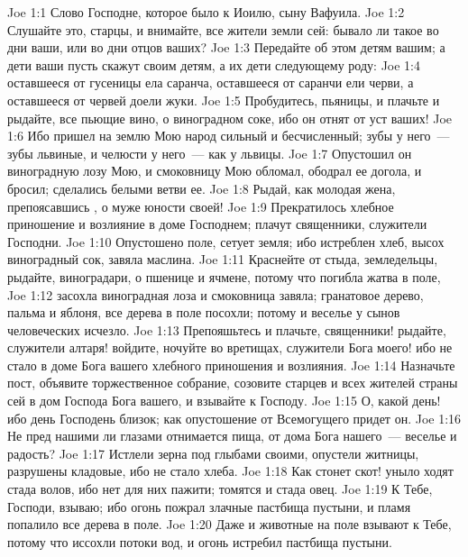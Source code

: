 \vs Joe 1:1 Слово Господне, которое было к Иоилю, сыну Вафуила.
\vs Joe 1:2 Слушайте это, старцы, и внимайте, все жители земли сей: бывало ли такое во дни ваши, или во дни отцов ваших?
\vs Joe 1:3 Передайте об этом детям вашим; а дети ваши пусть скажут своим детям, а их дети следующему роду:
\vs Joe 1:4 оставшееся от гусеницы ела саранча, оставшееся от саранчи ели черви, а оставшееся от червей доели жуки.
\vs Joe 1:5 Пробудитесь, пьяницы, и плачьте и рыдайте, все пьющие вино, о виноградном соке, ибо он отнят от уст ваших!
\vs Joe 1:6 Ибо пришел на землю Мою народ сильный и бесчисленный; зубы у него~--- зубы львиные, и челюсти у него~--- как у львицы.
\vs Joe 1:7 Опустошил он виноградную лозу Мою, и смоковницу Мою обломал, ободрал ее догола, и бросил; сделались белыми ветви ее.
\vs Joe 1:8 Рыдай, как молодая жена, препоясавшись , о муже юности своей!
\vs Joe 1:9 Прекратилось хлебное приношение и возлияние в доме Господнем; плачут священники, служители Господни.
\vs Joe 1:10 Опустошено поле, сетует земля; ибо истреблен хлеб, высох виноградный сок, завяла маслина.
\vs Joe 1:11 Краснейте от стыда, земледельцы, рыдайте, виноградари, о пшенице и ячмене, потому что погибла жатва в поле,
\vs Joe 1:12 засохла виноградная лоза и смоковница завяла; гранатовое дерево, пальма и яблоня, все дерева в поле посохли; потому и веселье у сынов человеческих исчезло.
\vs Joe 1:13 Препояшьтесь  и плачьте, священники! рыдайте, служители алтаря! войдите, ночуйте во вретищах, служители Бога моего! ибо не стало в доме Бога вашего хлебного приношения и возлияния.
\vs Joe 1:14 Назначьте пост, объявите торжественное собрание, созовите старцев и всех жителей страны сей в дом Господа Бога вашего, и взывайте к Господу.
\vs Joe 1:15 О, какой день! ибо день Господень близок; как опустошение от Всемогущего придет он.
\vs Joe 1:16 Не пред нашими ли глазами отнимается пища, от дома Бога нашего~--- веселье и радость?
\vs Joe 1:17 Истлели зерна под глыбами своими, опустели житницы, разрушены кладовые, ибо не стало хлеба.
\vs Joe 1:18 Как стонет скот! уныло ходят стада волов, ибо нет для них пажити; томятся и стада овец.
\vs Joe 1:19 К Тебе, Господи, взываю; ибо огонь пожрал злачные пастбища пустыни, и пламя попалило все дерева в поле.
\vs Joe 1:20 Даже и животные на поле взывают к Тебе, потому что иссохли потоки вод, и огонь истребил пастбища пустыни.
